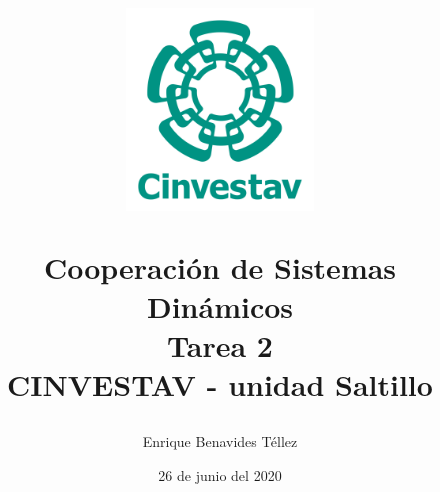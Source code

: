 \documentclass[12pt]{article}
\title{
\centerline{\includegraphics[width=50mm]{img/Cinvestav-logo.png}}
\vspace{0.25 cm}
Cooperación de Sistemas Dinámicos\\
\large Tarea 2\\

\small CINVESTAV  - unidad Saltillo
}
\author{Enrique Benavides Téllez}
\date{26 de junio del 2020}
\begin{document}
\maketitle


%
%



\clearpage
\nocite{*}



\clearpage

\end{document}
